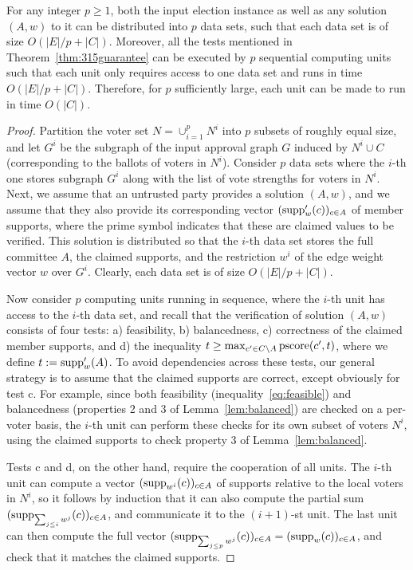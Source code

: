 \begin{lemma}
For any integer $p\geq 1$, both the input election instance as well as any solution $(A,w)$ to it can be distributed into $p$ data sets, such that each data set is of size $O(|E|/p + |C|)$. 
Moreover, all the tests mentioned in Theorem~\ref{thm:315guarantee} can be executed by $p$ sequential computing units such that each unit only requires access to one data set and runs in time $O(|E|/p + |C|)$. 
Therefore, for $p$ sufficiently large, each unit can be made to run in time $O(|C|)$.
\end{lemma}

\begin{proof}
Partition the voter set $N=\cup_{i=1}^p N^i$ into $p$ subsets of roughly equal size, and let $G^i$ be the subgraph of the input approval graph $G$ induced by $N^i\cup C$ (corresponding to the ballots of voters in $N^i$). 
Consider $p$ data sets where the $i$-th one stores subgraph $G^i$ along with the list of vote strengths for voters in $N^i$. 
%
Next, we assume that an untrusted party provides a solution $(A,w)$, and we assume that they also provide its corresponding vector $(\operatorname{supp}'_w(c))_{c\in A}$ of member supports, where the prime symbol indicates that these are claimed values to be verified. 
This solution is distributed so that the $i$-th data set stores the full committee $A$, the claimed supports, and the restriction $w^i$ of the edge weight vector $w$ over $G^i$. 
Clearly, each data set is of size $O(|E|/p + |C|)$.

Now consider $p$ computing units running in sequence, where the $i$-th unit has access to the $i$-th data set, and recall that the verification of solution $(A,w)$ consists of four tests: a) feasibility, b) balancedness, c) correctness of the claimed member supports, and d) the inequality $t\geq \max_{c'\in C\setminus A} \operatorname{pscore}(c',t)$, where we define $t:=\operatorname{supp}'_w(A)$. 
To avoid dependencies across these tests, our general strategy is to assume that the claimed supports are correct, except obviously for test c. 
For example, since both feasibility (inequality~\ref{eq:feasible}) and balancedness (properties 2 and 3 of Lemma~\ref{lem:balanced}) are checked on a per-voter basis, the $i$-th unit can perform these checks for its own subset of voters $N^i$, using the claimed supports to check property 3 of Lemma~\ref{lem:balanced}. 

Tests c and d, on the other hand, require the cooperation of all units. 
The $i$-th unit can compute a vector $(\operatorname{supp}_{w^i}(c))_{c\in A}$ of supports relative to the local voters in $N^i$, so it follows by induction that it can also compute the partial sum $(\operatorname{supp}_{\sum_{j\leq i}w^j}(c))_{c\in A}$, and communicate it to the $(i+1)$-st unit. The last unit can then compute the full vector $(\operatorname{supp}_{\sum_{j\leq p}w^j}(c))_{c\in A}=(\operatorname{supp}_{w}(c))_{c\in A}$, and check that it matches the claimed supports. 


\end{proof}
